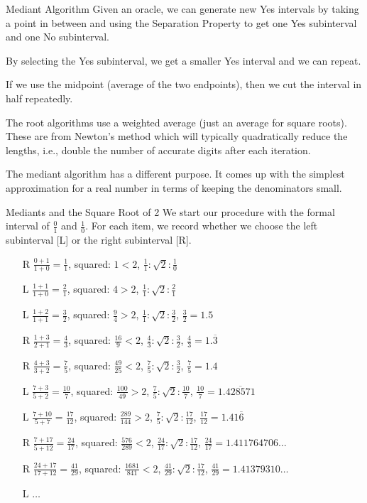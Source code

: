 \documentclass{beamer}
\begin{document}
\begin{frame}{Mediant Algorithm}
    Given an oracle, we can generate new Yes intervals by taking a point in between and using the Separation Property to get one Yes subinterval and one No subinterval. 

    By selecting the Yes subinterval, we get a smaller Yes interval and we can repeat. 

    If we use the midpoint (average of the two endpoints), then we cut the interval in half repeatedly. 

    The root algorithms use a weighted average (just an average for square roots). These are from Newton's method which will typically quadratically reduce the lengths, i.e., double the number of accurate digits after each iteration. 

    The mediant algorithm has a different purpose. It comes up with the simplest approximation for a real number in terms of keeping the denominators small. 
\end{frame}

\begin{frame}{Mediants and the Square Root of 2}
    We start our procedure with the formal interval of $\tfrac{0}{1}$ and $\tfrac{1}{0}$. For each item, we record whether we choose the left subinterval [L] or the right subinterval [R]. 


\begin{itemize}
    \item[R] $\tfrac{0+1}{1+0} = \tfrac{1}{1}$, squared: $1 < 2$,  $\tfrac{1}{1}:\sqrt{2}: \tfrac{1}{0} $ 
    \item[L] $\tfrac{1+1}{1+0} = \tfrac{2}{1}$, squared: $4 > 2$, $\tfrac{1}{1}:\sqrt{2}: \tfrac{2}{1}$
    \item[L] $\tfrac{1+2}{1+1} = \tfrac{3}{2}$, squared: $\tfrac{9}{4} > 2$, $\tfrac{1}{1}:\sqrt{2}: \tfrac{3}{2}$,  $\frac{3}{2} = 1.5$
    \item[R] $\tfrac{1+3}{2+1} = \tfrac{4}{3}$, squared: $\tfrac{16}{9} < 2$, $\tfrac{4}{3}:\sqrt{2}: \tfrac{3}{2}$, $\frac{4}{3} = 1.\overline{3}$
    \item[R] $\tfrac{4+3}{3+2} = \tfrac{7}{5}$, squared: $\tfrac{49}{25} < 2$, 
    $\tfrac{7}{5}:\sqrt{2}: \tfrac{3}{2}$,  $\frac{7}{5} = 1.4$
    \item[L] $\tfrac{7+3}{5+2} = \tfrac{10}{7}$, squared: $\tfrac{100}{49} > 2$, 
    $\tfrac{7}{5}:\sqrt{2}: \tfrac{10}{7}$,  $\frac{10}{7} = 1.\overline{428571}$
    \item[L] $\tfrac{7+10}{5+7} = \tfrac{17}{12}$, squared: $\tfrac{289}{144} > 2$, 
    $\tfrac{7}{5}:\sqrt{2}: \tfrac{17}{12}$,  $\frac{17}{12} = 1.41\overline{6}$
    \item[R] $\tfrac{7+17}{5+12} = \tfrac{24}{17}$, squared: $\tfrac{576}{289} < 2$, 
    $\tfrac{24}{17}:\sqrt{2}: \tfrac{17}{12}$,  $\frac{24}{17} = 1.411764706\ldots$
    \item[R] $\tfrac{24+17}{17+12} = \tfrac{41}{29}$, squared: $\tfrac{1681}{841} < 2$, 
    $\tfrac{41}{29}:\sqrt{2}: \tfrac{17}{12}$,  $\frac{41}{29} = 1.41379310\ldots$
    \item[L] $\ldots$
\end{itemize}
\end{frame}
\end{document}
